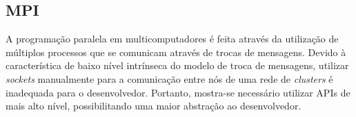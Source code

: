 
\subsection{MPI}

%
%
%

A programação paralela em multicomputadores é feita através da utilização de múltiplos processos que se comunicam
através de trocas de mensagens. Devido à característica de baixo nível intrínseca do modelo de troca de
mensagens, utilizar \textit{sockets} manualmente para a comunicação entre nós de
uma rede de \textit{clusters} é inadequada para o desenvolvedor. Portanto, mostra-se necessário utilizar
APIs de mais alto nível, possibilitando uma maior abstração ao desenvolvedor.

